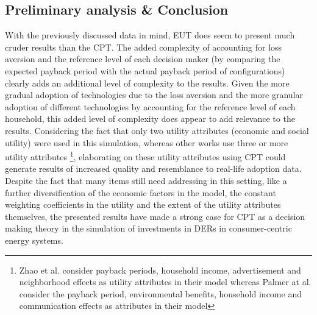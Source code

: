 \subsection{Preliminary analysis \& Conclusion}
With the previously discussed data in mind, EUT does seem to present much cruder results than the CPT. The added complexity of accounting for loss aversion and the reference level of each decision maker (by comparing the expected payback period with the actual payback period of configurations) clearly adds an additional level of complexity to the results. Given the more gradual adoption of technologies due to the loss aversion and the more granular adoption of different technologies by accounting for the reference level of each household, this added level of complexity does appear to add relevance to the results. 
\newline \newline \noindent
Considering the fact that only two utility attributes (economic and social utility) were used in this simulation, whereas other works use three or more utility attributes \footnote{Zhao et al. \cite{ABMPV} consider payback periods, household income, advertisement and neighborhood effects as utility attributes in their model whereas Palmer at al. \cite{ItalyAdoption} consider the payback period, environmental benefits, household income and communication effects as attributes in their model}, elaborating on these utility attributes using CPT could generate results of increased quality and resemblance to real-life adoption data. 
\newline \newline \noindent
Despite the fact that many items still need addressing in this setting, like a further diversification of the economic factors in the model, the constant weighting coefficients in the utility and the extent of the utility attributes themselves, the presented results have made a strong case for CPT as a decision making theory in the simulation of investments in DERs in consumer-centric energy systems.
